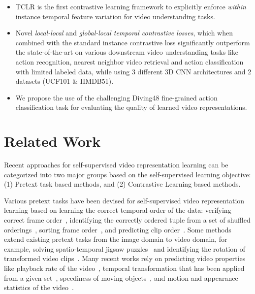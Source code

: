 \documentclass[10pt,twocolumn,letterpaper]{article}
\begin{document}
\begin{itemize}
    \item TCLR is the first contrastive learning framework to explicitly enforce \textit{within} instance temporal feature variation for video understanding tasks. 
    \item Novel {\em local-local} and {\em global-local temporal contrastive losses}, which when combined with the standard instance contrastive loss significantly outperform the state-of-the-art on various downstream video understanding tasks like action recognition, nearest neighbor video retrieval and action classification with limited labeled data, while using 3 different 3D CNN architectures and 2 datasets (UCF101 \& HMDB51).  
    \item We propose the use of the challenging Diving48 fine-grained action classification task for evaluating the quality of learned video representations. 
    
\end{itemize}

\section{Related Work}
 Recent approaches for self-supervised video representation learning can be categorized into two major groups based on the self-supervised learning objective: (1) Pretext task based methods, and (2) Contrastive Learning based methods.



  Various pretext tasks have been devised for self-supervised video representation learning based on learning the correct temporal order of the data: verifying correct frame order~\cite{misra2016shuffle}, identifying the correctly ordered tuple from a set of shuffled orderings~\cite{fernando2017self, suzuki2018learning}, sorting frame order~\cite{lee2017unsupervised}, and predicting clip order~\cite{vcop}. Some methods extend existing pretext tasks from the image domain to video domain, for example, solving spatio-temporal jigsaw puzzles~\cite{videojigsaw, aaai19, csj} and identifying the rotation of transformed video clips~\cite{3drotnet}. Many recent works rely on predicting video properties like playback rate of the video~\cite{cho2020self,prp,pace_pred,iclr21submitted_st_invariant}, temporal transformation that has been applied from a given set~\cite{simon,jenni2021time}, speediness of moving objects~\cite{speedNet}, and motion and appearance statistics of the video~\cite{statistics_cvpr19, statistics2}. 
\end{document}
